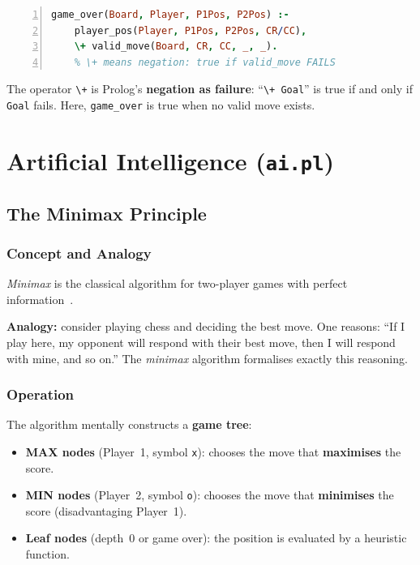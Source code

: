 \begin{lstlisting}[language=Prolog,
    caption={End-game detection},
    label={lst:game_over},
    numbers=left,
    basicstyle=\small\ttfamily,
    frame=single]
game_over(Board, Player, P1Pos, P2Pos) :-
    player_pos(Player, P1Pos, P2Pos, CR/CC),
    \+ valid_move(Board, CR, CC, _, _).
    % \+ means negation: true if valid_move FAILS
\end{lstlisting}

The operator \texttt{\textbackslash+} is Prolog's \textbf{negation as failure}:
``\texttt{\textbackslash+~Goal}'' is true if and only if \texttt{Goal} fails.
Here, \texttt{game\_over} is true when no valid move exists.

\section{Artificial Intelligence (\texttt{ai.pl})}
\label{sec:ai}

\subsection{The Minimax Principle}
\label{subsec:minimax}

\subsubsection{Concept and Analogy}

\textit{Minimax} is the classical algorithm for two-player games with
perfect information~\cite{russell2020artificial}.

\textbf{Analogy:} consider playing chess and deciding the best move.
One reasons: ``If I play here, my opponent will respond with their best
move, then I will respond with mine, and so on.'' The \textit{minimax}
algorithm formalises exactly this reasoning.

\subsubsection{Operation}

The algorithm mentally constructs a \textbf{game tree}:

\begin{itemize}
  \item \textbf{MAX nodes} (Player~1, symbol \texttt{x}): chooses the
        move that \textbf{maximises} the score.
  \item \textbf{MIN nodes} (Player~2, symbol \texttt{o}): chooses the
        move that \textbf{minimises} the score (disadvantaging Player~1).
  \item \textbf{Leaf nodes} (depth~0 or game over): the position is
        evaluated by a heuristic function.
\end{itemize}

